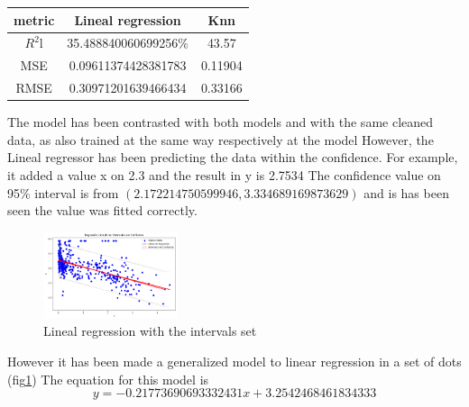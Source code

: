 \documentclass{article}
\begin{document}
\begin{center}
  \begin{tabular}{|c|c|c|}
    \hline
     metric & Lineal regression & Knn \\ \hline
     $R^2$l& 35.488840060699256\%&43.57\\
     MSE&0.09611374428381783&0.11904\\
     RMSE&0.30971201639466434&0.33166\\
     \hline
  \end{tabular}
\end{center}
The model has been contrasted with both models and with the same cleaned data, as also trained at the same way respectively at the model 
However, the Lineal regressor has been predicting the data within the confidence.
For example, it added a value x on 2.3 and the result in y is 2.7534 
The confidence value on 95\% interval is  from $(2.172214750599946, 3.334689169873629)$
and is has been seen the value was fitted correctly.
\begin{figure}[h]
  \includegraphics[width=0.35\textwidth]{data2_plot.png}
  \caption{Lineal regression with the intervals set}

  \label{fig:example_intervals}
\end{figure}
However it has been made a generalized model to linear regression in a set of dots (fig\ref{fig:example_intervals})
The equation for this model is 
$$y=-0.21773690693332431x+3.2542468461834333$$
\end{document}
